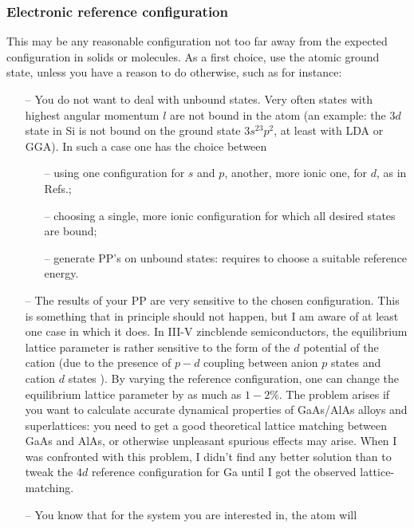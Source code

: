 \documentclass[12pt]{article}
\begin{document}
\subsubsection{Electronic reference configuration}
\label{RefConf}
This may be any reasonable configuration not too far away from
the expected configuration in solids or molecules. As a first
choice, use the atomic ground state, unless you have a reason 
to do otherwise, such as for instance:
\begin{enumerate}
\item[--]
   You do not want to deal with unbound states.
   Very often states with highest angular momentum $l$ are not bound
   in the atom (an example: the $3d$ state in Si is not bound on the
   ground state $3s^23p^2$, at least with LDA or GGA). In such a case 
   one has the choice between 
   \begin{enumerate} 
      \item[--] using one configuration for $s$ and $p$, another, more
                ionic one, for $d$, as in Refs.\cite{BHS,Gonze};
      \item[--] choosing a single, more ionic configuration for which 
                all desired states are bound;
      \item[--] generate PP's on unbound states: requires to choose
                a suitable reference energy.
   \end{enumerate}
\item[--]
   The results of your PP are very sensitive to the chosen configuration.
   This is something that in principle should not happen, but
   I am aware of at least one case in which it does. In III-V
   zincblende semiconductors, the equilibrium lattice parameter
   is rather sensitive to the form of the $d$ potential of the 
   cation (due to the presence of $p-d$ coupling between anion 
   $p$ states and cation $d$ states \cite{Zunger}). By varying
   the reference configuration, one can change the equilibrium 
   lattice parameter by as much as $1-2\%$. 
   The problem arises if you want to calculate accurate dynamical
   properties of GaAs/AlAs alloys and superlattices: you need to
   get a good theoretical lattice matching between GaAs and AlAs,
   or otherwise unpleasant spurious effects may arise. When I was 
   confronted with this problem, I didn't find any better solution
   than to tweak the $4d$ reference configuration for Ga until I got
   the observed lattice-matching.
\item[--]
   You know that for the system you are interested in, the atom will 

\end{enumerate}
\end{document}
